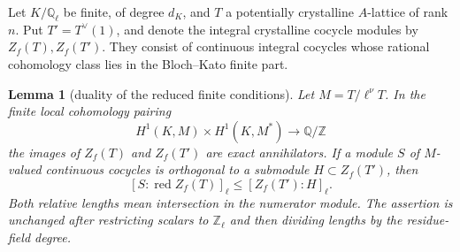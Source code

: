 \documentclass[11pt,a4paper]{article}
\newtheorem{lemma}[theorem]{Lemma}
\theoremstyle{definition}
\newcommand{\Q}{\mathbb Q}
\newcommand{\Z}{\mathbb Z}
\begin{document}
Let \(K/\Q_\ell\) be finite, of degree \(d_K\),
and \(T\) a potentially crystalline \(A\)-lattice
of rank \(n\). Put \(T'=T^\vee(1)\), and denote
the integral crystalline cocycle modules by
\(Z_f(T),Z_f(T')\). They consist of continuous
integral cocycles whose rational cohomology
class lies in the Bloch--Kato finite part.

\begin{lemma}[duality of the reduced finite conditions]
\label{lem:reduced-finite-dual}
Let \(M=T/\ell^\nu T\). In the finite local
cohomology pairing
\[
 H^1(K,M)\times H^1(K,M^*)\longrightarrow\Q/\Z
\]
the images of \(Z_f(T)\) and \(Z_f(T')\) are
exact annihilators.
If a module \(S\) of \(M\)-valued continuous
cocycles is orthogonal to a submodule
\(H\subset Z_f(T')\), then
\[
 [S:\operatorname{red}Z_f(T)]_\ell
                   \le[Z_f(T'):H]_\ell .
\]
Both relative lengths mean intersection in the
numerator module. The assertion is unchanged
after restricting scalars to \(\Z_\ell\) and
then dividing lengths by the residue-field degree.
\end{lemma}
\end{document}
